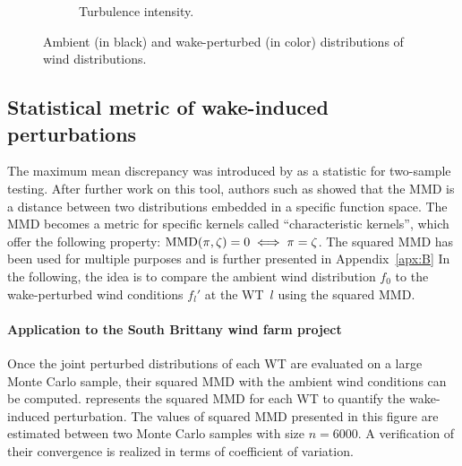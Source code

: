 \begin{figure}
\begin{subfigure}[b]{0.48\textwidth}
        \caption{Turbulence intensity.}
        \label{fig:FIGMarginalTI}
    \end{subfigure}
    \caption{Ambient (in black) and wake-perturbed (in color) distributions of wind distributions.}
\end{figure}





\subsection{Statistical metric of wake-induced perturbations}\label{sec:metric}


The maximum mean discrepancy was introduced by \cite{gretton_2006} as a statistic for two-sample testing. 
After further work on this tool, authors such as \cite{sriperumbudur_2010} showed that the MMD is a distance between two distributions embedded in a specific function space. 
The MMD becomes a metric for specific kernels called “characteristic kernels”, which offer the following property: $\mathrm{MMD}(\pi, \zeta)=0 \iff \pi = \zeta$. 
The squared MMD has been used for multiple purposes and is further presented in Appendix~\ref{apx:B}
In the following, the idea is to compare the ambient wind distribution $f_0$ to the wake-perturbed wind conditions $f_l'$ at the WT~$l$ using the squared MMD.

\paragraph{Application to the South Brittany wind farm project}
Once the joint perturbed distributions of each WT are evaluated on a large Monte Carlo sample, their squared MMD with the ambient wind conditions can be computed. 
 represents the squared MMD for each WT to quantify the wake-induced perturbation. 
The values of squared MMD presented in this figure are estimated between two Monte Carlo samples with size $n=6000$. 
A verification of their convergence is realized in terms of coefficient of variation. 

